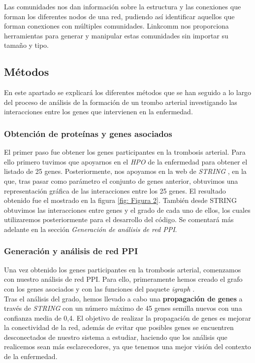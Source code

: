 Las comunidades nos dan información sobre la estructura y las conexiones que forman los diferentes nodos de una red, pudiendo así identificar aquellos que forman conexiones con múltiples comunidades. Linkcomm \cite{linkcomm} nos proporciona herramientas para generar y manipular estas comunidades sin importar su tamaño y tipo.



\subsection{Métodos}

En este apartado se explicará los diferentes métodos que se han seguido a lo largo del proceso de análisis de la formación de un trombo arterial investigando las interacciones entre los genes que intervienen en la enfermedad.


\subsubsection{Obtención de proteínas y genes asociados}

El primer paso fue obtener los genes participantes en la trombosis arterial. Para ello primero tuvimos que apoyarnos en el \textit{HPO} de la enfermedad \cite{HPO} para obtener el listado de 25 genes. Posteriormente, nos apoyamos en la web de \textit{STRING} \cite{STRING} , en la que, tras pasar como parámetro el conjunto de genes anterior, obtuvimos una representación gráfica de las interacciones entre los 25 genes. El resultado obtenido fue el mostrado en la figura \ref{fig: Figura 2}. También desde STRING obtuvimos las interacciones entre genes y el grado de cada uno de ellos, los cuales utilizaremos posteriormente para el desarrollo del código. Se comentará más adelante en la sección \textit{Generación de análisis de red PPI}. \\



\subsubsection{Generación y análisis de red PPI}
Una vez obtenido los genes participantes en la trombosis arterial, comenzamos con nuestro análisis de red PPI. Para ello, primeramente hemos creado el grafo con los genes asociados y con las funciones del paquete \textit{igraph} \cite{igraph}. \\

Tras el análisis del grado, hemos llevado a cabo una \textbf{propagación de genes} a través de \textit{STRING} \cite{STRING} con un número máximo de 45 genes semilla nuevos con una confianza media de 0,4. El objetivo de realizar la propagación de genes es mejorar la conectividad de la red, además de evitar que posibles genes se encuentren desconectados de nuestro sistema a estudiar, haciendo que los análisis que realicemos sean más esclarecedores, ya que tenemos una mejor visión del contexto de la enfermedad. \\

